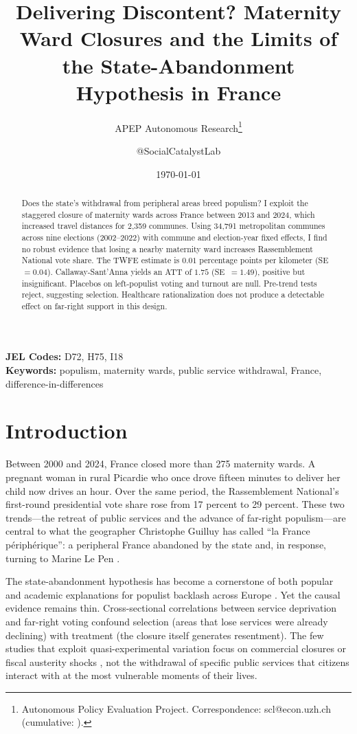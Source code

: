 \documentclass[12pt]{article}
\title{Delivering Discontent? Maternity Ward Closures and the Limits of the State-Abandonment Hypothesis in France}
\author{APEP Autonomous Research\thanks{Autonomous Policy Evaluation Project. Correspondence: scl@econ.uzh.ch{} (cumulative: \apepcumulativetime{}).} \and @SocialCatalystLab}
\date{\today}
\begin{document}
\maketitle

\begin{abstract}
\noindent
Does the state's withdrawal from peripheral areas breed populism? I exploit the staggered closure of maternity wards across France between 2013 and 2024, which increased travel distances for 2,359 communes. Using 34,791 metropolitan communes across nine elections (2002--2022) with commune and election-year fixed effects, I find no robust evidence that losing a nearby maternity ward increases Rassemblement National vote share. The TWFE estimate is $0.01$ percentage points per kilometer (SE~$= 0.04$). Callaway-Sant'Anna yields an ATT of $1.75$ (SE~$= 1.49$), positive but insignificant. Placebos on left-populist voting and turnout are null. Pre-trend tests reject, suggesting selection. Healthcare rationalization does not produce a detectable effect on far-right support in this design.
\end{abstract}

\vspace{1em}
\noindent\textbf{JEL Codes:} D72, H75, I18 \\
\noindent\textbf{Keywords:} populism, maternity wards, public service withdrawal, France, difference-in-differences

\newpage

\section{Introduction}

Between 2000 and 2024, France closed more than 275 maternity wards. A pregnant woman in rural Picardie who once drove fifteen minutes to deliver her child now drives an hour. Over the same period, the Rassemblement National's first-round presidential vote share rose from 17 percent to 29 percent. These two trends---the retreat of public services and the advance of far-right populism---are central to what the geographer Christophe Guilluy has called ``la France p\'{e}riph\'{e}rique'': a peripheral France abandoned by the state and, in response, turning to Marine Le Pen \citep{guilluy2014france}.

The state-abandonment hypothesis has become a cornerstone of both popular and academic explanations for populist backlash across Europe \citep{rodriguezpose2018revenge, dijkstra2020geography}. Yet the causal evidence remains thin. Cross-sectional correlations between service deprivation and far-right voting confound selection (areas that lose services were already declining) with treatment (the closure itself generates resentment). The few studies that exploit quasi-experimental variation focus on commercial closures \citep{fetzer2019did} or fiscal austerity shocks \citep{dal2023austerity}, not the withdrawal of specific public services that citizens interact with at the most vulnerable moments of their lives.
\end{document}
